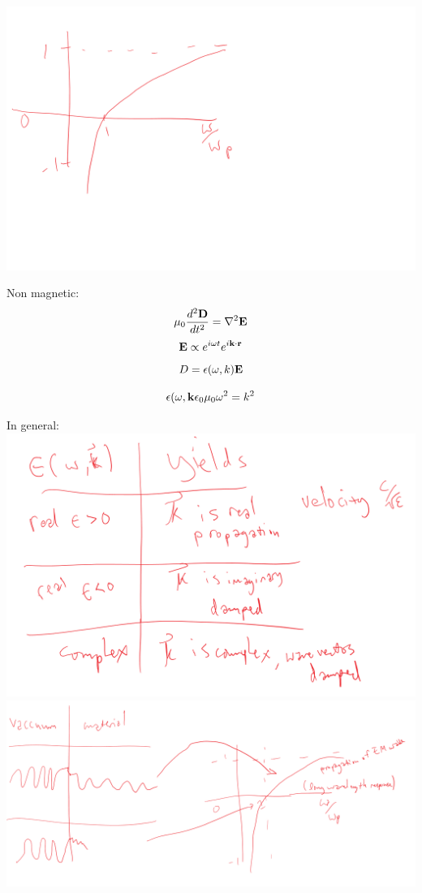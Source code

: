 \documentclass[english, 11pt]{article}
\begin{document}
		\includegraphics{plasmonfreq.png}
		
		Non magnetic:
		\begin{equation}
			\mu_0 \frac{d^2\textrm{\textbf{D}}}{dt^2} = \nabla^2 \textrm{\textbf{E}}
		\end{equation}
		\begin{equation}
			\textrm{\textbf{E}} \propto e^{i\omega t} e^{i\textrm{\textbf{k}} \cdot \textrm{\textbf{r}}}
		\end{equation}
		\begin{equation}
			D = \epsilon (\omega, k) \textrm{\textbf{E}}
		\end{equation}
		
		\begin{equation}
			\epsilon(\omega, \textrm{\textbf{k}} \epsilon_0 \mu_0 \omega^2 = k^2
		\end{equation}
		
		In general:
		\includegraphics{table.png}
		\includegraphics{waves.png}
		
\end{document}
